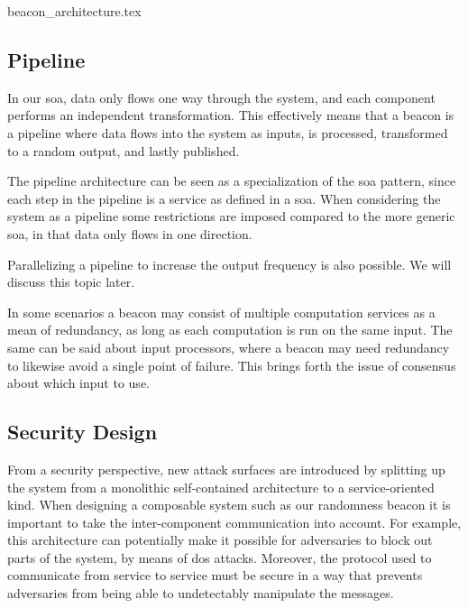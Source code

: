 {beacon_architecture.tex}

\subsection{Pipeline}%
\label{sub:pipeline}
In our \gls{soa}, data only flows one way through the system, and each component performs an independent transformation.
This effectively means that a beacon is a pipeline where data flows into the system as inputs, is processed, transformed to a random output, and lastly published.

The pipeline architecture can be seen as a specialization of the \gls{soa} pattern, since each step in the pipeline is a service as defined in a \gls{soa}.
When considering the system as a pipeline some restrictions are imposed compared to the more generic \gls{soa}, in that data only flows in one direction.

Parallelizing a pipeline to increase the output frequency is also possible. We will discuss this topic later.

In some scenarios a beacon may consist of multiple computation services as a mean of redundancy, as long as each computation is run on the same input.
The same can be said about input processors, where a beacon may need redundancy to likewise avoid a single point of failure.
This brings forth the issue of consensus about which input to use.

\subsection{Security Design}

From a security perspective, new attack surfaces are introduced by splitting up the system from a monolithic self-contained architecture to a service-oriented kind.
When designing a composable system such as our randomness beacon it is important to take the inter-component communication into account.
For example, this architecture can potentially make it possible for adversaries to block out parts of the system, by means of \gls{dos} attacks.
Moreover, the protocol used to communicate from service to service must be secure in a way that prevents adversaries from being able to undetectably manipulate the messages.

